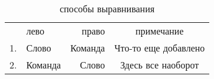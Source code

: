\begin{table}
	\centering
\begin{tabular}[t]{|c|l|r|c|}
	\hline
	\textnumero&лево&право&примечание\\
	1.&Слово&Команда&Что-то еще добавлено\\
	2.&Команда&Слово&Здесь все наоборот\\
	\hline
\end{tabular}
\label{tab:from-second.tex}
\caption{способы выравнивания}
\end{table}
